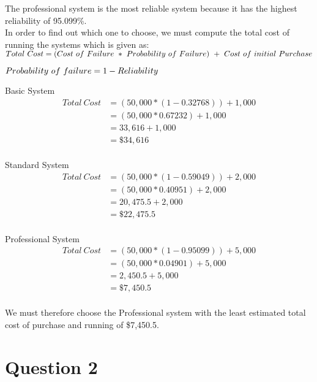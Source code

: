\documentclass[12pt]{article}
\begin{document}
	The professional system is the most reliable system because it has the highest reliability of 95.099\%.\\
	
	
	In order to find out which one to choose, we must compute the total cost of running the systems which is given as: \\
	
	\begin{math} 
	Total\ Cost = (Cost\ of\ Failure\ *\ Probability\ of\ Failure)\ +\ Cost\ of\ initial\ Purchase\\
	\end{math}
	
	\begin{math}
	Probability\ of\ failure = 1 - Reliability\\
	\end{math}
	
	Basic System
	\begin{align*}
	Total\ Cost &= (50,000 * (1 - 0.32768)) + 1,000\\
	&= (50,000 * 0.67232) + 1,000\\
	&= 33,616 + 1,000\\
	&= \$34,616\\
	\end{align*}
	
	Standard System
	\begin{align*}
	Total\ Cost &= (50,000 * (1 - 0.59049)) + 2,000\\
	&= (50,000 * 0.40951) + 2,000\\
	&= 20,475.5 + 2,000\\
	&= \$22,475.5\\
	\end{align*}
	
	Professional System
	\begin{align*}
	Total\ Cost &= (50,000 * (1 - 0.95099)) + 5,000\\
	&= (50,000 * 0.04901) + 5,000\\
	&= 2,450.5 + 5,000\\
	&= \$7,450.5\\
	\end{align*}
	
	We must therefore choose the Professional system with the least estimated total cost of purchase and running of \$7,450.5.
	
	
	\section*{Question 2}
	
\end{document}

